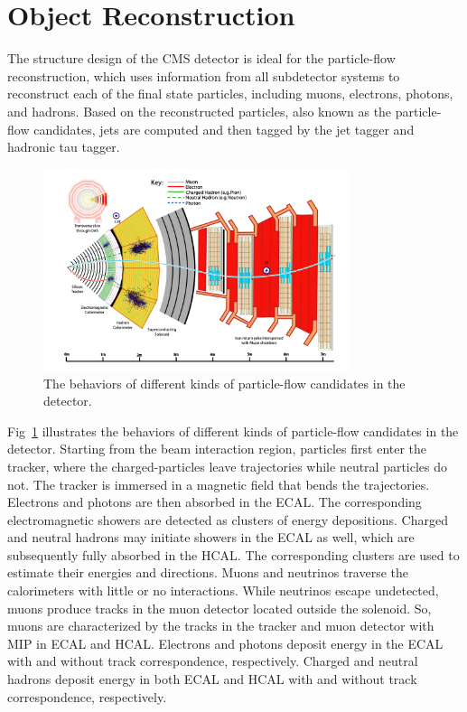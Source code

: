 
\section{Object Reconstruction}
\label{sec:cmsExperiment:reconstruction}

The structure design of the CMS detector is ideal for the particle-flow reconstruction, which uses information from all subdetector systems to reconstruct each of the final state particles, including muons, electrons, photons, and hadrons. Based on the reconstructed particles, also known as the particle-flow candidates, jets are computed and then tagged by the \PQb jet tagger and hadronic tau tagger.

\begin{figure}[ht]
    \centering
    \includegraphics[width=0.8\textwidth]{chapters/CMSExperiment/sectionReconstruction/figures/pfa.png}
    \caption{The behaviors of different kinds of particle-flow candidates in the detector.}
    \label{fig:cmsExperiment:reconstruction:pfa}
\end{figure}

Fig~\ref{fig:cmsExperiment:reconstruction:pfa} illustrates the behaviors of different kinds of particle-flow candidates in the detector. Starting from the beam interaction region, particles first enter the tracker, where the charged-particles leave trajectories while neutral particles do not. The tracker is immersed in a magnetic field that bends the trajectories. Electrons and photons are then absorbed in the ECAL. The corresponding electromagnetic showers are detected as clusters of energy depositions. Charged and neutral hadrons may initiate showers in the ECAL as well, which are subsequently fully absorbed in the HCAL. The corresponding clusters are used to estimate their energies and directions. Muons and neutrinos traverse the calorimeters with little or no interactions. While neutrinos escape undetected, muons produce tracks in the muon detector located outside the solenoid. So, muons are characterized by the tracks in the tracker and muon detector with MIP in ECAL and HCAL. Electrons and photons deposit energy in the ECAL with and without track correspondence, respectively. Charged and neutral hadrons deposit energy in both ECAL and HCAL with and without track correspondence, respectively. 



